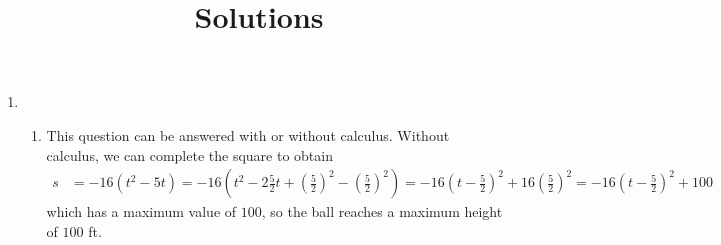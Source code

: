 \documentclass{article}
\title{\commonPSTitleZeroTwoSeven\ Solutions}
\author{\commonAuthor}
\date{\commonDateZeroTwoSeven}
\begin{document}
\maketitle
\begin{enumerate}
\item %
  \begin{enumerate}
  \item This question can be answered with or without calculus.
    Without calculus, we can complete the square to obtain
    \begin{align*}
      s &= -16(t^2-5t) 
      = -16\left(t^2-2\frac{5}{2}t
        +\left(\frac{5}{2}\right)^2-\left(\frac{5}{2}\right)^2\right)
      = -16\left(t-\frac{5}{2}\right)^2+16\left(\frac{5}{2}\right)^2
      = -16\left(t-\frac{5}{2}\right)^2+100
    \end{align*}
    which has a maximum value of $100$, so the ball reaches a maximum
    height of $100$ ft.


\end{enumerate}
\end{enumerate}
\end{document}

